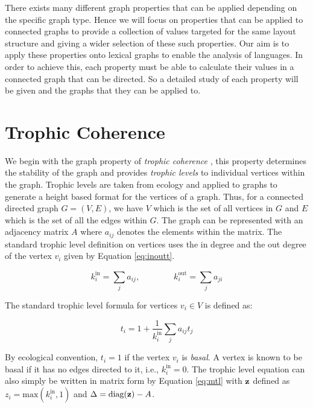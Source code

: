 There exists many different graph properties that can be applied depending on the specific graph type. Hence we will focus on properties that can be applied to connected graphs to provide a collection of values targeted for the same layout structure and giving a wider selection of these such properties. Our aim is to apply these properties onto lexical graphs to enable the analysis of languages. In order to achieve this, each property must be able to calculate their values in a connected graph that can be directed. So a detailed study of each property will be given and the graphs that they can be applied to. 

\section{Trophic Coherence}
We begin with the graph property of \emph{trophic coherence} \cite{johnson2014trophic}, this property determines the stability of the graph and provides \emph{trophic levels} to individual vertices within the graph. Trophic levels are taken from ecology and applied to graphs to generate a height based format for the vertices of a graph. Thus, for a connected directed graph $G =(V,E)$, we have $V$ which is the set of all vertices in $G$ and $E$ which is the set of all the edges within $G$. The graph can be represented with an adjacency matrix $A$ where $a_{ij}$ denotes the elements within the matrix. The standard trophic level definition on vertices uses the in degree and the out degree of the vertex $v_i$ given by Equation \ref{eq:inoutt}.

\begin{equation} \label{eq:inoutt}
k_i^{\text{in}} = \sum_ja_{ij} , \qquad \qquad k_i^{\text{out}} = \sum_ja_{ji} 
\end{equation}

The standard trophic level formula for vertices $v_i \in V$ is defined as:

\begin{equation}
t_i = 1 + \frac{1}{k_i^{\text{in}}}\sum_ja_{ij}t_j
\end{equation}

By ecological convention, $t_i = 1$ if the vertex $v_i$ is \emph{basal}. A vertex is known to be basal if it has no edges directed to it, i.e., $k_i^{\text{in}} = 0$. The trophic level equation can also simply be written in matrix form by Equation \ref{eq:mtl} with $\bold{z}$ defined as $z_i = \text{max}(k_i^{\text{in}},1)$ and $\Delta = \text{diag}(\bold{z}) - A$.

